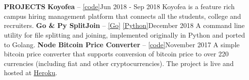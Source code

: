 \documentclass[a4paper, 12pt]{article}
\begin{document}
\section*{}
\begin{vwcol}[widths={0.2, 0.8}, justify=flush, sep=0.7cm, rule=0pt, indent=1em]
\large{\textbf{\textcolor{uclagold}{PROJECTS}}}\newline\newline\newline\newline\newline\newline\newline\newline\newline\newline\newline\newline\newline\newline\newline\newline\newline\newline
\large{\textbf{Koyofea} -- \textcolor{frenchblue}{\href{https://github.com/IamRaviTejaG/koyofea-back}{[code]}}}\hspace{8.4cm}\tiny{Jun 2018 - Sep 2018}\vspace{-0.05cm}\newline
\small{Koyofea is a feature rich campus hiring management platform that connects all the students, college and recruiters.}\vspace{0.3cm}\newline
\large{\textbf{Go \& Py SplitJoin} -- \textcolor{frenchblue}{\href{https://github.com/IamRaviTejaG/go-split-join}{[Go]} \href{https://github.com/IamRaviTejaG/pysj}{[Python]}}}\hspace{4.6cm}\tiny{December 2018}\vspace{-0.05cm}\newline
\small{A command line utility for file splitting and joining, implemented originally in Python and ported to Golang.}\vspace{0.3cm}\newline
\large{\textbf{Node Bitcoin Price Converter} -- \textcolor{frenchblue}{\href{https://github.com/IamRaviTejaG/Node-Bitcoin-Price-Converter}{[code]}}}\hspace{3.5cm}\tiny{November 2017}\vspace{-0.05cm}\newline
\small{A simple bitcoin price converter that supports conversion of bitcoin price to over 220 currencies (including fiat and other cryptocurrencies). The project is live and hosted at \textcolor{frenchblue}{\href{https://btc-price-converter.herokuapp.com}{Heroku}}.}\vspace{0.3cm}\newline
\normalsize
\end{vwcol}
\end{document}
